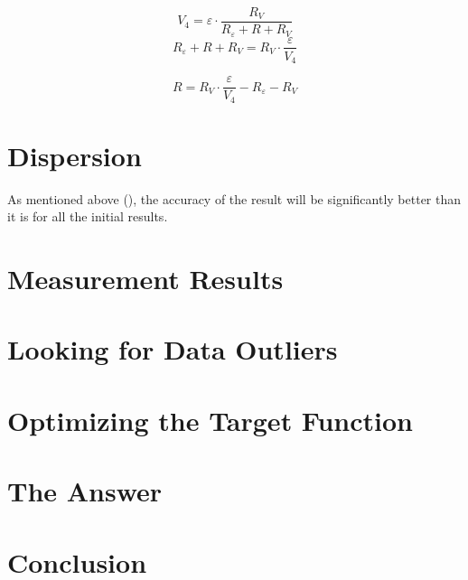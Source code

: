 \documentclass[11pt]{memoir}
\begin{document}
    \begin{equation*}
        V_4 = \varepsilon \cdot \frac{R_V}{R_\varepsilon + R + R_V}
    \end{equation*}
    \begin{equation*}
        R_\varepsilon + R + R_V = R_V \cdot \frac{\varepsilon}{V_4}
    \end{equation*}

    \begin{equation}\label{eq:equation4}
        R = R_V \cdot \frac{\varepsilon}{V_4} - R_\varepsilon - R_V
    \end{equation}



%
%

    \section {Dispersion}\label{sec:dispersion}
        \newline
        As mentioned above (), the accuracy of the result will be significantly better than it is for all the initial results.

    \section{Measurement Results}\label{sec:measurement-results}

    \section {Looking for Data Outliers}\label{sec:looking-for-data-outliers}

    \section{Optimizing the Target Function}\label{sec:optimizing-the-target-function}


    \section{The Answer}\label{sec:answer}


    \section{Conclusion}\label{sec:conclusion}
\end{document}
